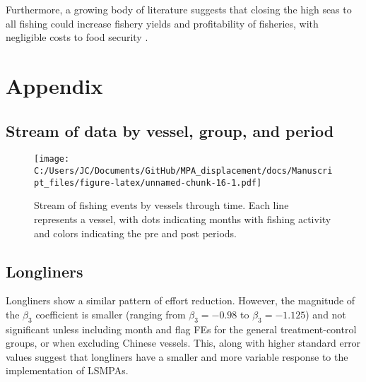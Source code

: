 \documentclass[11pt,]{article}
\begin{document}
Furthermore, a growing body of literature suggests that closing the high
seas to all fishing could increase fishery yields and profitability of
fisheries, with negligible costs to food security
\citep{white_2014,sumaila_2015,sala_2018a,schiller_2018}.

\clearpage

\hypertarget{refs}{}

\clearpage

\hypertarget{appendix}{%
\section{Appendix}\label{appendix}}

\setcounter{table}{0}  \renewcommand{\thetable}{S\arabic{table}} \setcounter{figure}{0} \renewcommand{\thefigure}{S\arabic{figure}}

\hypertarget{stream-of-data-by-vessel-group-and-period}{%
\subsection{Stream of data by vessel, group, and
period}\label{stream-of-data-by-vessel-group-and-period}}

\begin{figure}
\centering
\texttt{[image: C:/Users/JC/Documents/GitHub/MPA\_displacement/docs/Manuscript\_files/figure-latex/unnamed-chunk-16-1.pdf]}
\caption{\label{fig:unnamed-chunk-16}\label{fig:baci_strict}Stream of
fishing events by vessels through time. Each line represents a vessel,
with dots indicating months with fishing activity and colors indicating
the pre and post periods.}
\end{figure}

\clearpage

\hypertarget{longliners}{%
\subsection{Longliners}\label{longliners}}

Longliners show a similar pattern of effort reduction. However, the
magnitude of the \(\beta_3\) coefficient is smaller (ranging from
\(\beta_3 = -0.98\) to \(\beta_3 = -1.125\)) and not significant unless
including month and flag FEs for the general treatment-control groups,
or when excluding Chinese vessels. This, along with higher standard
error values suggest that longliners have a smaller and more variable
response to the implementation of LSMPAs.
\end{document}
